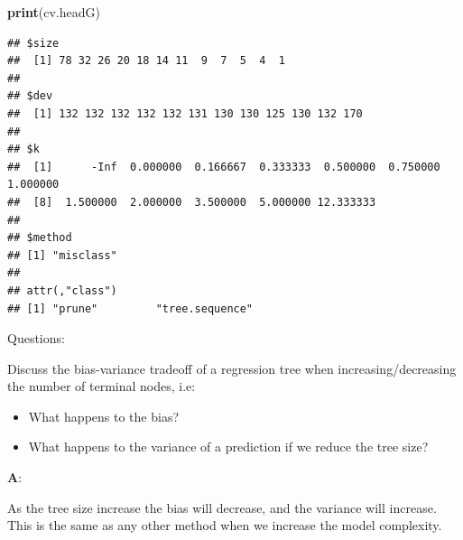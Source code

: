 \documentclass[ignorenonframetext,]{beamer}
\newenvironment{Shaded}{\begin{snugshade}}{\end{snugshade}}
\newcommand{\KeywordTok}[1]{\textcolor[rgb]{0.13,0.29,0.53}{\textbf{#1}}}
\newcommand{\NormalTok}[1]{#1}
\providecommand{\tightlist}{%
  \setlength{\itemsep}{0pt}\setlength{\parskip}{0pt}}
\begin{document}
\begin{frame}[fragile]

\begin{Shaded}
\begin{Highlighting}[]
\KeywordTok{print}\NormalTok{(cv.headG)}
\end{Highlighting}
\end{Shaded}

\begin{verbatim}
## $size
##  [1] 78 32 26 20 18 14 11  9  7  5  4  1
## 
## $dev
##  [1] 132 132 132 132 132 131 130 130 125 130 132 170
## 
## $k
##  [1]      -Inf  0.000000  0.166667  0.333333  0.500000  0.750000  1.000000
##  [8]  1.500000  2.000000  3.500000  5.000000 12.333333
## 
## $method
## [1] "misclass"
## 
## attr(,"class")
## [1] "prune"         "tree.sequence"
\end{verbatim}

\end{frame}

\begin{frame}

\begin{block}{Questions:}

Discuss the bias-variance tradeoff of a regression tree when
increasing/decreasing the number of terminal nodes, i.e:

\begin{itemize}
\tightlist
\item
  What happens to the bias?
\item
  What happens to the variance of a prediction if we reduce the tree
  size?
\end{itemize}

\end{block}

\end{frame}

\begin{frame}

\textbf{A}:

As the tree size increase the bias will decrease, and the variance will
increase. This is the same as any other method when we increase the
model complexity.

\end{frame}
\end{document}
